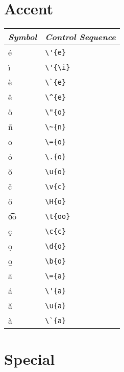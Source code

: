 \documentclass[a4paper,12pt]{article}
\begin{document}
\section*{Accent}
                           
\begin{tabular}{l|l}
    \emph{\textbf{Symbol}} & \emph{\textbf{Control Sequence}} \\
    \hline
    \'{e}  & \verb|\'{e}|  \\
    \'{\i} & \verb|\'{\i}| \\
    \`{e}  & \verb|\`{e}|  \\
    \^{e}  & \verb|\^{e}|  \\
    \"{o}  & \verb|\"{o}|  \\
    \~{n}  & \verb|\~{n}|  \\
    \={o}  & \verb|\={o}|  \\
    \.{o}  & \verb|\.{o}|  \\
    \u{o}  & \verb|\u{o}|  \\
    \v{c}  & \verb|\v{c}|  \\
    \H{o}  & \verb|\H{o}|  \\
    \t{oo} & \verb|\t{oo}| \\
    \c{c}  & \verb|\c{c}|  \\
    \d{o}  & \verb|\d{o}|  \\
    \b{o}  & \verb|\b{o}|  \\
    \hline        
    \={a}  & \verb|\={a}|  \\
    \'{a}  & \verb|\'{a}|  \\
    \u{a}  & \verb|\u{a}|  \\
    \`{a}  & \verb|\`{a}|  \\
\end{tabular}

\section*{Special}
\end{document}
